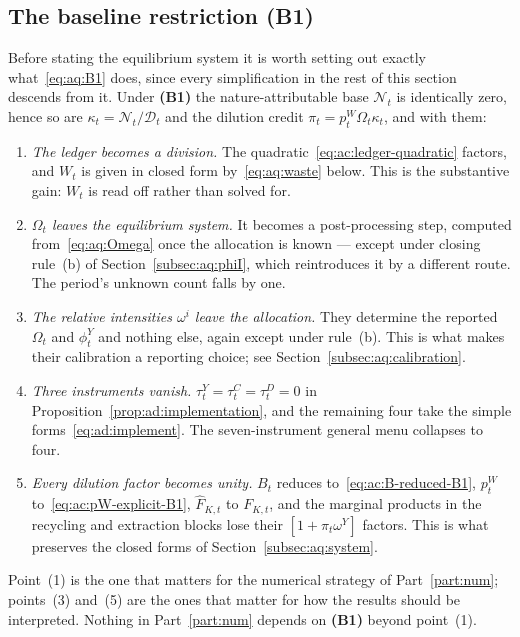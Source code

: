 \subsection{The baseline restriction \textbf{(B1)}}
\label{subsec:aq:B1}

Before stating the equilibrium system it is worth setting out exactly what~\eqref{eq:aq:B1} does, since every simplification in the rest of this section descends from it. Under \textbf{(B1)} the nature-attributable base $\mathcal N_t$ is identically zero, hence so are $\kappa_t=\mathcal N_t/\mathcal D_t$ and the dilution credit $\pi_t=p^W_t\Omega_t\kappa_t$, and with them:

\begin{enumerate}[label=(\arabic*),leftmargin=2.4em,itemsep=0.25em]
\item \emph{The ledger becomes a division.} The quadratic~\eqref{eq:ac:ledger-quadratic} factors, and $W_t$ is given in closed form by~\eqref{eq:aq:waste} below. This is the substantive gain: $W_t$ is read off rather than solved for.
\item \emph{$\Omega_t$ leaves the equilibrium system.} It becomes a post-processing step, computed from~\eqref{eq:aq:Omega} once the allocation is known --- except under closing rule~(b) of Section~\ref{subsec:aq:phiI}, which reintroduces it by a different route. The period's unknown count falls by one.
\item \emph{The relative intensities $\omega^i$ leave the allocation.} They determine the reported $\Omega_t$ and $\phi^Y_t$ and nothing else, again except under rule~(b). This is what makes their calibration a reporting choice; see Section~\ref{subsec:aq:calibration}.
\item \emph{Three instruments vanish.} $\tau^Y_t=\tau^C_t=\tau^D_t=0$ in Proposition~\ref{prop:ad:implementation}, and the remaining four take the simple forms~\eqref{eq:ad:implement}. The seven-instrument general menu collapses to four.
\item \emph{Every dilution factor becomes unity.} $B_t$ reduces to~\eqref{eq:ac:B-reduced-B1}, $p^W_t$ to~\eqref{eq:ac:pW-explicit-B1}, $\widehat F_{K,t}$ to $F_{K,t}$, and the marginal products in the recycling and extraction blocks lose their $\left[1+\pi_t\omega^Y\right]$ factors. This is what preserves the closed forms of Section~\ref{subsec:aq:system}.
\end{enumerate}

Point~(1) is the one that matters for the numerical strategy of Part~\ref{part:num}; points~(3) and~(5) are the ones that matter for how the results should be interpreted. Nothing in Part~\ref{part:num} depends on \textbf{(B1)} beyond point~(1).

